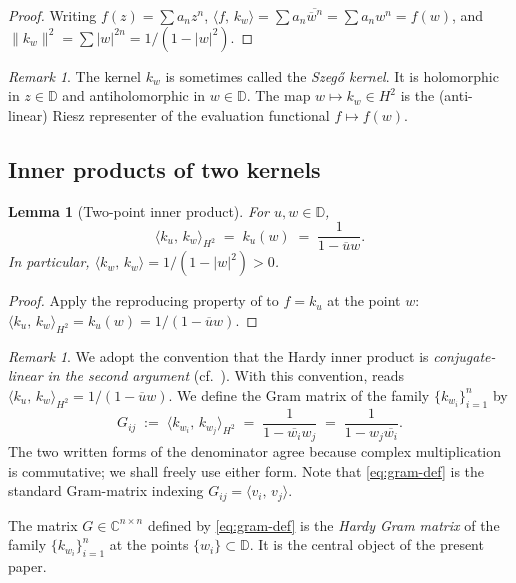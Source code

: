 \documentclass[12pt]{article}
\newtheorem{lemma}[theorem]{Lemma}
\theoremstyle{definition}
\theoremstyle{remark}
\newtheorem{remark}[theorem]{Remark}
\newcommand{\C}{\mathbb{C}}
\newcommand{\D}{\mathbb{D}}
\newcommand{\HHH}{H^{2}}
\newcommand{\inner}[2]{\langle #1,\,#2\rangle}
\newcommand{\norm}[1]{\lVert #1 \rVert}
\newcommand{\abs}[1]{\lvert #1 \rvert}
\newcommand{\conj}[1]{\overline{#1}}
\begin{document}
\begin{proof}
Writing $f(z)=\sum a_{n}z^{n}$,
$\inner{f}{k_{w}}=\sum a_{n}\conj{\conj{w}^{n}}=\sum a_{n}w^{n}=f(w)$,
and $\norm{k_{w}}^{2}=\sum\abs{w}^{2n}=1/(1-\abs{w}^{2})$.
\end{proof}

\begin{remark}\label{rem:hardy-id}
The kernel $k_{w}$ is sometimes called the \emph{Szeg\H{o} kernel}. It is
holomorphic in $z\in\D$ and antiholomorphic in $w\in\D$. The map
$w\mapsto k_{w}\in\HHH$ is the (anti-linear) Riesz representer of the
evaluation functional $f\mapsto f(w)$.
\end{remark}

\subsection{Inner products of two kernels}

\begin{lemma}[Two-point inner product]\label{lem:two-point}
For $u,w\in\D$,
\[
  \inner{k_{u}}{k_{w}}_{\HHH}\;=\;k_{u}(w)\;=\;\frac{1}{1-\conj{u}w}.
\]
In particular, $\inner{k_{w}}{k_{w}}=1/(1-\abs{w}^{2})>0$.
\end{lemma}

\begin{proof}
Apply the reproducing property of  to $f=k_{u}$ at the
point $w$: $\inner{k_{u}}{k_{w}}_{\HHH}=k_{u}(w)=1/(1-\conj{u}w)$.
\end{proof}

\begin{remark}\label{rem:inner-product-convention}
We adopt the convention that the Hardy inner product is
\emph{conjugate-linear in the second argument} (cf.~). With
this convention,  reads
$\inner{k_{u}}{k_{w}}_{\HHH}=1/(1-\conj{u}w)$. We define the Gram matrix
of the family $\{k_{w_{i}}\}_{i=1}^{n}$ by
\begin{equation}\label{eq:gram-def}
  G_{ij}\;:=\;\inner{k_{w_{i}}}{k_{w_{j}}}_{\HHH}\;=\;\frac{1}{1-\conj{w_{i}}w_{j}}\;=\;\frac{1}{1-w_{j}\conj{w_{i}}}.
\end{equation}
The two written forms of the denominator agree because complex multiplication
is commutative; we shall freely use either form. Note that
\eqref{eq:gram-def} is the standard Gram-matrix indexing $G_{ij}=\inner{v_{i}}{v_{j}}$.
\end{remark}

The matrix $G\in\C^{n\times n}$ defined by \eqref{eq:gram-def} is the
\emph{Hardy Gram matrix} of the family $\{k_{w_{i}}\}_{i=1}^{n}$ at the
points $\{w_{i}\}\subset\D$. It is the central object of the present paper.
\end{document}
